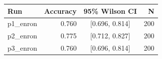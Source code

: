 \begin{tabular}{lrcr}
\toprule
Run & Accuracy & 95\% Wilson CI & N \\
\midrule
p1_enron & 0.760 & [0.696, 0.814] & 200 \\
p2_enron & 0.775 & [0.712, 0.827] & 200 \\
p3_enron & 0.760 & [0.696, 0.814] & 200 \\
\bottomrule
\end{tabular}
